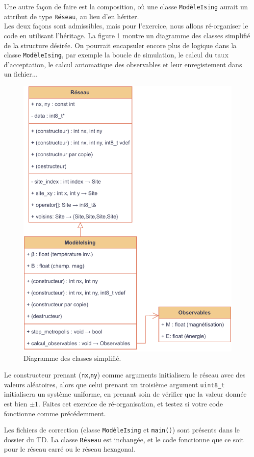 \documentclass{book}
\newcommand{\inline}[1]{\texttt{#1}}
\renewenvironment{correction}{}{}
\begin{document}
Une autre façon de faire est la composition, où une classe \inline{ModèleIsing} aurait un attribut de type \inline{Réseau}, au lieu d'en hériter.\\

Les deux façons sont admissibles, mais pour l'exercice, nous allons ré-organiser le code en utilisant l'héritage. La figure \ref{fig:diag-classes-ising} montre un diagramme des classes simplifié de la structure désirée. On pourrait encapsuler encore plus de logique dans la classe \inline{ModèleIsing}, par exemple la boucle de simulation, le calcul du taux d'acceptation, le calcul automatique des observables et leur enregistement dans un fichier...\\

\begin{figure}[h]
\centering
\includegraphics[width=0.55\linewidth]{TD4/diag-classes-ising.pdf}
\caption{Diagramme des classes simplifié.}
\label{fig:diag-classes-ising}
\end{figure}

Le constructeur prenant (\inline{nx},\inline{ny}) comme arguments initialisera le réseau avec des valeurs aléatoires, alors que celui prenant un troisième argument \inline{uint8_t} initialisera un système uniforme, en prenant soin de vérifier que la valeur donnée est bien $\pm 1$. Faites cet exercice de ré-organisation, et testez si votre code fonctionne comme précédemment.

\begin{correction}
Les fichiers de correction (classe \inline{ModèleIsing} et \inline{main()}) sont présents dans le dossier du TD. La classe \inline{Réseau} est inchangée, et le code fonctionne que ce soit pour le réseau carré ou le réseau hexagonal.
\end{correction}
\end{document}
